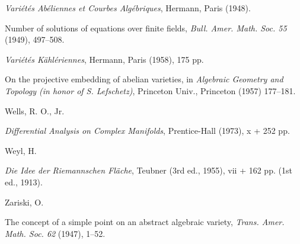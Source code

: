 {\noindent\hangindent=25bp\hspace*{6bp}%
\emph{Vari\'et\'es Ab\'eliennes et Courbes Alg\'ebriques}, Hermann, Paris (1948).\par
\noindent\hangindent=25bp\hspace*{6bp}%
Number of solutions of equations over finite fields, \emph{Bull. Amer. Math. Soc. 55} (1949), 497--508.\par
\noindent\hangindent=25bp\hspace*{6bp}%
\emph{Vari\'et\'es K\"ahl\'eriennes}, Hermann, Paris (1958), 175 pp.\par
\noindent\hangindent=25bp\hspace*{6bp}%
On the projective embedding of abelian varieties, in \emph{Algebraic Geometry and Topology (in honor of S. Lefschetz)}, Princeton Univ., Princeton (1957) 177--181.\par
\par\vspace{2.15pt}\noindent \hypertarget{bib-483-9}{}Wells, R. O., Jr.\par
\noindent\hangindent=25bp\hspace*{6bp}%
\emph{Differential Analysis on Complex Manifolds}, Prentice-Hall (1973), x + 252 pp.\par
\par\vspace{2.15pt}\noindent \hypertarget{bib-483-10}{}Weyl, H.\par
\noindent\hangindent=25bp\hspace*{6bp}%
\emph{Die Idee der Riemannschen Fl\"ache}, Teubner (3rd ed., 1955), vii + 162 pp. (1st ed., 1913).\par
\par\vspace{2.15pt}\noindent \hypertarget{bib-483-11}{}Zariski, O.\par
\noindent\hangindent=25bp\hspace*{6bp}%
The concept of a simple point on an abstract algebraic variety, \emph{Trans. Amer. Math. Soc. 62} (1947), 1--52.\par
}
